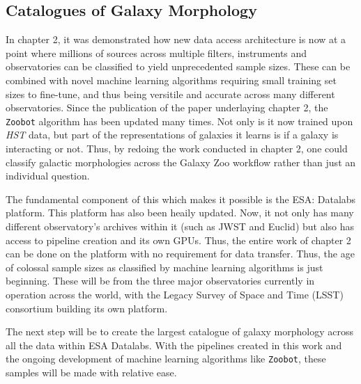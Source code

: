 \subsection{Catalogues of Galaxy Morphology}
\noindent In chapter 2, it was demonstrated how new data access architecture is now at a point where millions of sources across multiple filters, instruments and observatories can be classified to yield unprecedented sample sizes. These can be combined with novel machine learning algorithms requiring small training set sizes to fine-tune, and thus being versitile and accurate across many different observatories. Since the publication of the paper underlaying chapter 2, the \texttt{Zoobot} algorithm has been updated many times. Not only is it now trained upon \textit{HST} data, but part of the representations of galaxies it learns is if a galaxy is interacting or not. Thus, by redoing the work conducted in chapter 2, one could classify galactic morphologies across the Galaxy Zoo workflow rather than just an individual question.

The fundamental component of this which makes it possible is the ESA: Datalabs platform. This platform has also been heaily updated. Now, it not only has many different observatory's archives within it (such as JWST and Euclid) but also has access to pipeline creation and its own GPUs. Thus, the entire work of chapter 2 can be done on the platform with no requirement for data transfer. Thus, the age of colossal sample sizes as classified by machine learning algorithms is just beginning. These will be from the three major observatories currently in operation across the world, with the Legacy Survey of Space and Time (LSST) consortium building its own platform.

The next step will be to create the largest catalogue of galaxy morphology across all the data within ESA Datalabs. With the pipelines created in this work and the ongoing development of machine learning algorithms like \texttt{Zoobot}, these samples will be made with relative ease.

